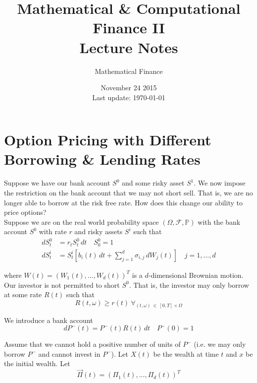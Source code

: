 \documentclass[12pt]{article}
\newlength\tindent
\renewcommand{\indent}{\hspace*{\tindent}}
\renewcommand{\P}{\mathbb P}
\begin{document}
 
 
\title{Mathematical \& Computational Finance II\\Lecture Notes}
\author{Mathematical Finance}
\date{November 24 2015 \\ Last update: \today{}}
\maketitle

\section{Option Pricing with Different Borrowing \& Lending Rates}

\indent Suppose we have our bank account $S^0$ and some risky asset $S^1$. We now impose the restriction on the bank account that we may not short sell. That is, we are no longer able to borrow at the risk free rate. How does this change our ability to price options? \\

\indent Suppose we are on the real world probability space $(\Omega, \mathcal F, \P)$ with the bank account $S^0$ with rate $r$ and risky assets $S^i$ such that
\begin{align*}
	dS^0_t &= r_tS^0_t\,dt \quad S^0_0 = 1 \\
	dS^i_t &= S^i_t \left[ b_i(t)\,dt + \sum^d_{j = 1} \sigma_{i,j}\,dW_j(t) \right] \quad j = 1, ..., d
\end{align*}

where $W(t) = (W_1(t), ..., W_d(t))^T$ is a $d$-dimensional Brownian motion. Our investor is not permitted to short $S^0$. That is, the investor may only borrow at some rate $R(t)$ such that 
\begin{equation*}
	R(t, \omega) \geq r(t)~\forall_{(t, \omega)~\in~[0, T] \times \Omega}
\end{equation*}

We introduce a bank account
\begin{equation*}
	dP^-(t) = P^-(t)R(t)\,dt \quad P^-(0) = 1
\end{equation*}

\indent Assume that we cannot hold a positive number of units of $P^-$ (i.e. we may only borrow $P^-$ and cannot invest in $P^-$). Let $X(t)$ be the wealth at time $t$ and $x$ be the initial wealth. Let
\begin{equation*}
	\vec{\Pi}(t) = \left( \Pi_1(t), ..., \Pi_d(t) \right)^T
\end{equation*} 
\end{document}
